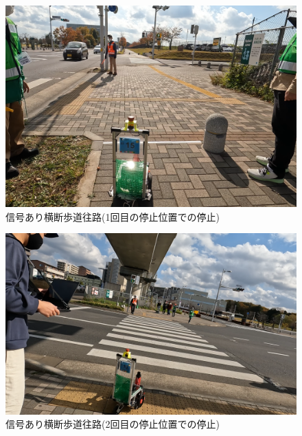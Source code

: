 \documentclass[twocolumn,9pt]{jsproceedings}
\begin{document}
\begin{figure}[h]
  \begin{center}
    \includegraphics[width=1.0\linewidth]{figs/stop_first_stop_position.pdf}
    \caption{信号あり横断歩道往路(1回目の停止位置での停止)}
    \label{fig:stop_first_stop_position}
  \end{center}
\end{figure}

\begin{figure}[h]
  \begin{center}
    \includegraphics[width=1.0\linewidth]{figs/stop_second_stop_position.pdf}
    \caption{信号あり横断歩道往路(2回目の停止位置での停止)}
    \label{fig:stop_second_stop_position}
  \end{center}
\end{figure}
\end{document}

